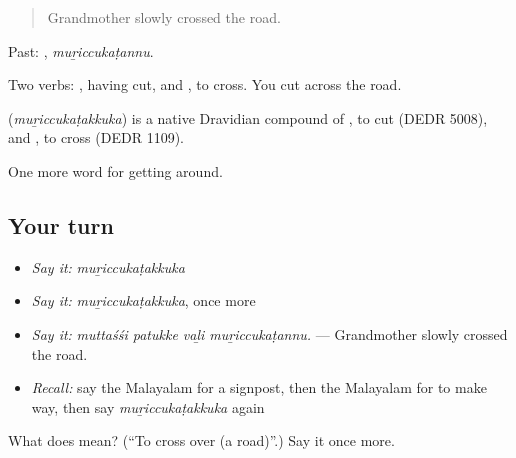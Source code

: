 \begin{quote}
Grandmother slowly crossed the road.
\end{quote}

Past: , \emph{muṟiccukaṭannu}.

Two verbs: , having cut, and , to cross. You cut across the road.

\begin{cousinweb}
\textbf{} (\emph{muṟiccukaṭakkuka}) is a native Dravidian compound of , to cut (DEDR 5008), and , to cross (DEDR 1109).
\end{cousinweb}

\begin{grammarlens}[title={What you've built}]
One more word for getting around.
\end{grammarlens}

\subsection*{Your turn}
\begin{itemize}
\raggedright
  \item \emph{Say it:} \emph{muṟiccukaṭakkuka}
  \item \emph{Say it:} \emph{muṟiccukaṭakkuka}, once more
  \item \emph{Say it:} \emph{muttaśśi patukke vaḻi muṟiccukaṭannu.} — Grandmother slowly crossed the road.
  \item \emph{Recall:} say the Malayalam for a signpost, then the Malayalam for to make way, then say \emph{muṟiccukaṭakkuka} again
\end{itemize}

\begin{tcolorbox}[breakable,colback=teal!4,colframe=teal!35!black,title={Before you move on}]
What does  mean? (\textquotedblleft{}To cross over (a road)\textquotedblright{}.) Say it once more.
\end{tcolorbox}
